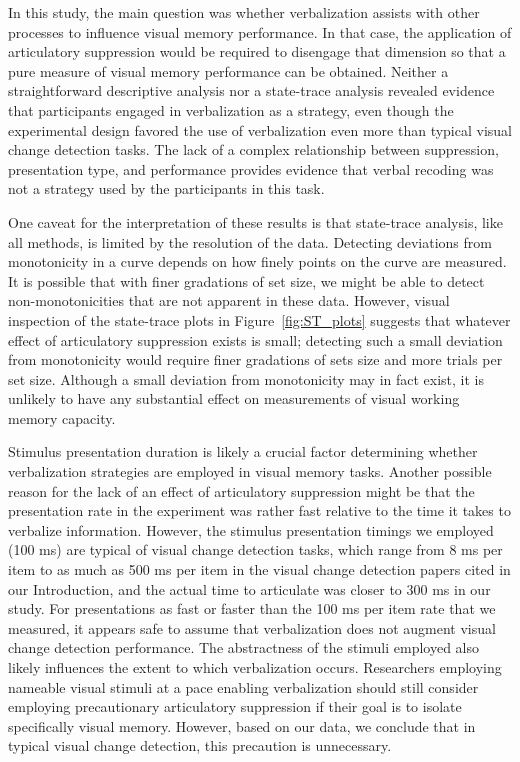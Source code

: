
In this study, the main question was whether verbalization assists with other processes to influence visual memory performance. In that case, the application of articulatory suppression would be required to disengage that dimension so that a pure measure of visual memory performance can be obtained. Neither a straightforward descriptive analysis nor a state-trace analysis revealed evidence that participants engaged in verbalization as a strategy, even though the experimental design favored the use of verbalization even more than typical visual change detection tasks. The lack of a complex relationship between suppression, presentation type, and performance provides evidence that verbal recoding was not a strategy used by the participants in this task.

One caveat for the interpretation of these results is that state-trace analysis, like all methods, is limited by the resolution of the data. Detecting deviations from monotonicity in a curve depends on how finely points on the curve are measured. It is possible that with finer gradations of set size, we might be able to detect non-monotonicities that are not apparent in these data. However, visual inspection of the state-trace plots in Figure~\ref{fig:ST_plots} suggests that whatever effect of articulatory suppression exists is small; detecting such a small deviation from monotonicity would require finer gradations of sets size and more trials per set size. Although a small deviation from monotonicity may in fact exist, it is unlikely to have any substantial effect on measurements of visual working memory capacity.

Stimulus presentation duration is likely a crucial factor determining whether verbalization strategies are employed in visual memory tasks. Another possible reason for the lack of an effect of articulatory suppression might be that the presentation rate in the experiment was rather fast relative to the time it takes to verbalize information. However, the stimulus presentation timings we employed (100 ms) are typical of visual change detection tasks, which range from 8 ms per item \citep{Woodman:Vogel:2005} to as much as 500 ms per item \citep{Brockmole:etal:2008} in the visual change detection papers cited in our Introduction, and the actual time to articulate was closer to 300 ms in our study. For presentations as fast or faster than the 100 ms per item rate that we measured, it appears safe to assume that verbalization does not augment visual change detection performance. The abstractness of the stimuli employed also likely influences the extent to which verbalization occurs. Researchers employing nameable visual stimuli at a pace enabling verbalization should still consider employing precautionary articulatory suppression if their goal is to isolate specifically visual memory. However, based on our data, we conclude that in typical visual change detection, this precaution is unnecessary.

